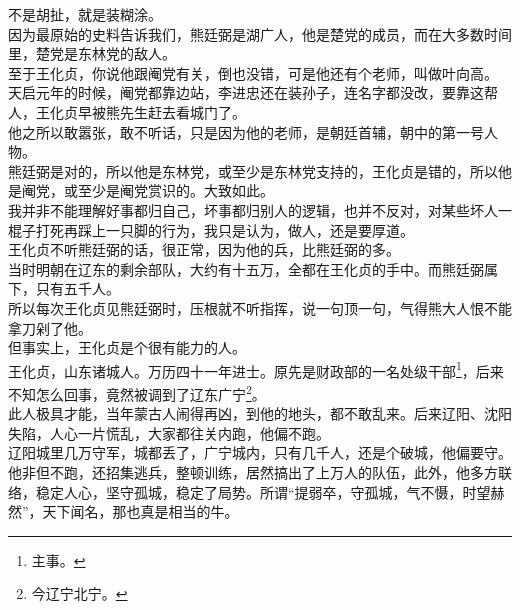 \begin{multicols}{\theparacolNo}
不是胡扯，就是装糊涂。\\

因为最原始的史料告诉我们，熊廷弼是湖广人，他是楚党的成员，而在大多数时间里，楚党是东林党的敌人。\\

至于王化贞，你说他跟阉党有关，倒也没错，可是他还有个老师，叫做叶向高。\\

天启元年的时候，阉党都靠边站，李进忠还在装孙子，连名字都没改，要靠这帮人，王化贞早被熊先生赶去看城门了。\\

他之所以敢嚣张，敢不听话，只是因为他的老师，是朝廷首辅，朝中的第一号人物。\\

熊廷弼是对的，所以他是东林党，或至少是东林党支持的，王化贞是错的，所以他是阉党，或至少是阉党赏识的。大致如此。\\

我并非不能理解好事都归自己，坏事都归别人的逻辑，也并不反对，对某些坏人一棍子打死再踩上一只脚的行为，我只是认为，做人，还是要厚道。\\

王化贞不听熊廷弼的话，很正常，因为他的兵，比熊廷弼的多。\\

当时明朝在辽东的剩余部队，大约有十五万，全都在王化贞的手中。而熊廷弼属下，只有五千人。\\

所以每次王化贞见熊廷弼时，压根就不听指挥，说一句顶一句，气得熊大人恨不能拿刀剁了他。\\

但事实上，王化贞是个很有能力的人。\\

王化贞，山东诸城人。万历四十一年进士。原先是财政部的一名处级干部\footnote{主事。}，后来不知怎么回事，竟然被调到了辽东广宁\footnote{今辽宁北宁。}。\\

此人极具才能，当年蒙古人闹得再凶，到他的地头，都不敢乱来。后来辽阳、沈阳失陷，人心一片慌乱，大家都往关内跑，他偏不跑。\\

辽阳城里几万守军，城都丢了，广宁城内，只有几千人，还是个破城，他偏要守。\\

他非但不跑，还招集逃兵，整顿训练，居然搞出了上万人的队伍，此外，他多方联络，稳定人心，坚守孤城，稳定了局势。所谓“提弱卒，守孤城，气不慑，时望赫然”，天下闻名，那也真是相当的牛。\\


\end{multicols}
